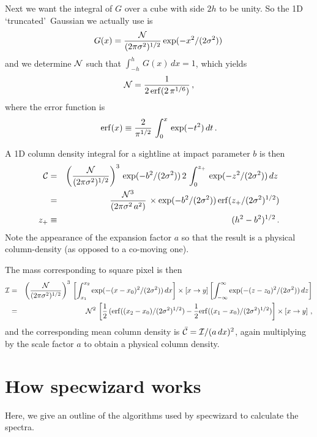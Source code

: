 \documentclass{report}
\begin{document}
Next we want the integral of $G$ over a cube with side $2h$ to be unity. So the 1D \lq truncated\rq\ Gaussian we actually use is
\begin{equation}
G(x) = {{\cal N}\over (2\pi \sigma^2)^{1/2}}\exp(-x^2/(2\sigma^2))\,
\end{equation}
and we determine ${\cal N}$ such that $\int_{-h}^{h}\,G(x)\,dx=1$, which yields
\begin{equation}
{\cal N} = {1\over 2\,{\rm erf}(2\,\pi^{1/6})}\,,
\end{equation}
where the error function is
\begin{equation}
{\rm erf}(x) \equiv {2\over \pi^{1/2}}\,\int_0^x\,\exp(-t^2)\,dt\,.
\end{equation}

A 1D column density integral for a sightline at impact parameter $b$ is then
\begin{eqnarray}
{\cal C} &=& \left({{\cal N}\over (2\pi \sigma^2)^{1/2}}\right)^3\,\exp(-b^2/(2\sigma^2))\,2\,\int_0^{z_+}\,\exp(-z^2/(2\sigma^2))\,dz\,\nonumber\\
&=& {{\cal N}^3\over (2\pi\sigma^2\,a^2)}\,\times \exp(-b^2/(2\sigma^2))\,{\rm erf}(z_+/(2\sigma^2)^{1/2})\nonumber\\
z_+ &\equiv & (h^2-b^2)^{1/2}\,.
\end{eqnarray}
Note the appearance of the expansion factor $a$ so that the result is a physical column-density (as opposed to a co-moving one).


The mass corresponding to square pixel is then
\begin{eqnarray}
{\cal I} &=& \left({{\cal N}\over (2\pi\sigma^2)^{1/2}}\right)^3\,\left[\int_{x_1}^{x_2}\exp(-(x-x_0)^2/(2\sigma^2))\,dx\right]\times\left[x\rightarrow y\right]\left[\int_{-\infty}^\infty \exp(-(z-z_0)^2/(2\sigma^2))\,dz\right]\nonumber\\
&=&{\cal N}^2\,\left[{1\over 2}\,({\rm erf}((x_2-x_0)/(2\sigma^2)^{1/2})-{1\over 2}{\rm erf}((x_1-x_0)/(2\sigma^2)^{1/2})\right]\times\left[x\rightarrow y\right]\,,
\end{eqnarray}
and the corresponding mean column density is $\bar{\cal C}={\cal I}/(a\,dx)^2$, again multiplying by the scale factor $a$ to obtain a physical column density.

\chapter{How specwizard works}
Here, we give an outline of the algorithms used by specwizard to calculate the spectra.
\end{document}
